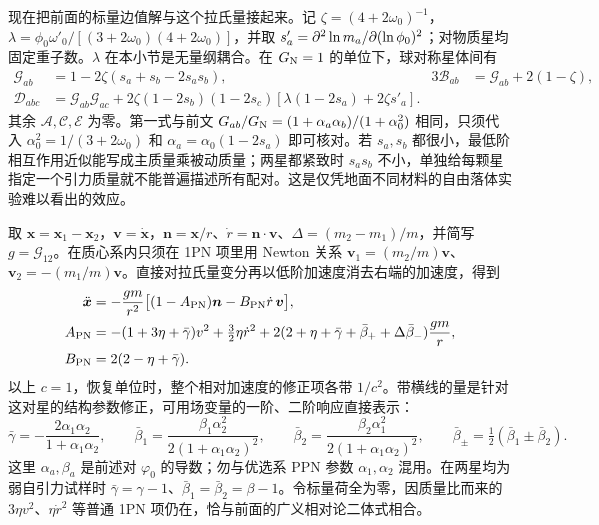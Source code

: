 现在把前面的标量边值解与这个拉氏量接起来。记 $\zeta=(4+2\omega_0)^{-1}$，$\lambda=\phi_0\omega'_0/[(3+2\omega_0)(4+2\omega_0)]$，并取 $s'_a=\partial^2\ln m_a/\partial(\ln\phi_0)^2$；对物质星均固定重子数。$\lambda$ 在本小节是无量纲耦合。在 $G_{\rm N}=1$ 的单位下，球对称星体间有
\begin{align*}
 \mathcal G_{ab}&=1-2\zeta(s_a+s_b-2s_as_b),
 &3\mathcal B_{ab}&=\mathcal G_{ab}+2(1-\zeta),\\
 \mathcal D_{abc}&=\mathcal G_{ab}\mathcal G_{ac}
  +2\zeta(1-2s_b)(1-2s_c)
      [\lambda(1-2s_a)+2\zeta s'_a].
\end{align*}
其余 $\mathcal A,\mathcal C,\mathcal E$ 为零。第一式与前文 $G_{ab}/G_{\rm N}=(1+\alpha_a\alpha_b)/(1+\alpha_0^2)$ 相同，只须代入 $\alpha_0^2=1/(3+2\omega_0)$ 和 $\alpha_a=\alpha_0(1-2s_a)$ 即可核对。若 $s_a,s_b$ 都很小，最低阶相互作用近似能写成主质量乘被动质量；两星都紧致时 $s_as_b$ 不小，单独给每颗星指定一个引力质量就不能普遍描述所有配对。这是仅凭地面不同材料的自由落体实验难以看出的效应。

取 $\bm x=\bm x_1-\bm x_2$，$\bm v=\dot{\bm x}$，$\bm n=\bm x/r$、$\dot r=\bm n\cdot\bm v$、$\Delta=(m_2-m_1)/m$，并简写 $g=\mathcal G_{12}$。在质心系内只须在 1PN 项里用 Newton 关系 $\bm v_1=(m_2/m)\bm v$、$\bm v_2=-(m_1/m)\bm v$。直接对拉氏量变分再以低阶加速度消去右端的加速度，得到
\begin{align*}
 \ddot{\bm x}&=-\frac{gm}{r^2}\big[(1-A_{\rm PN})\bm n
                              -B_{\rm PN}\dot r\,\bm v\big],\\
 A_{\rm PN}&=-(1+3\eta+\bar\gamma)v^2+\tfrac32\eta\dot r^2
       +2(2+\eta+\bar\gamma+\bar\beta_++\Delta\bar\beta_-)\frac{gm}{r},\\
 B_{\rm PN}&=2(2-\eta+\bar\gamma).
\end{align*}
以上 $c=1$，恢复单位时，整个相对加速度的修正项各带 $1/c^2$。带横线的量是针对这对星的结构参数修正，可用场变量的一阶、二阶响应直接表示：
\[
 \bar\gamma=-\frac{2\alpha_1\alpha_2}{1+\alpha_1\alpha_2},\qquad
 \bar\beta_1=\frac{\beta_1\alpha_2^2}{2(1+\alpha_1\alpha_2)^2},
 \qquad \bar\beta_2=\frac{\beta_2\alpha_1^2}{2(1+\alpha_1\alpha_2)^2},
 \qquad \bar\beta_\pm=\tfrac12(\bar\beta_1\pm\bar\beta_2).
\]
这里 $\alpha_a,\beta_a$ 是前述对 $\varphi_0$ 的导数；勿与优选系 PPN 参数 $\alpha_1,\alpha_2$ 混用。在两星均为弱自引力试样时 $\bar\gamma=\gamma-1$、$\bar\beta_1=\bar\beta_2=\beta-1$。令标量荷全为零，因质量比而来的 $3\eta v^2$、$\eta\dot r^2$ 等普通 1PN 项仍在，恰与前面的广义相对论二体式相合。

